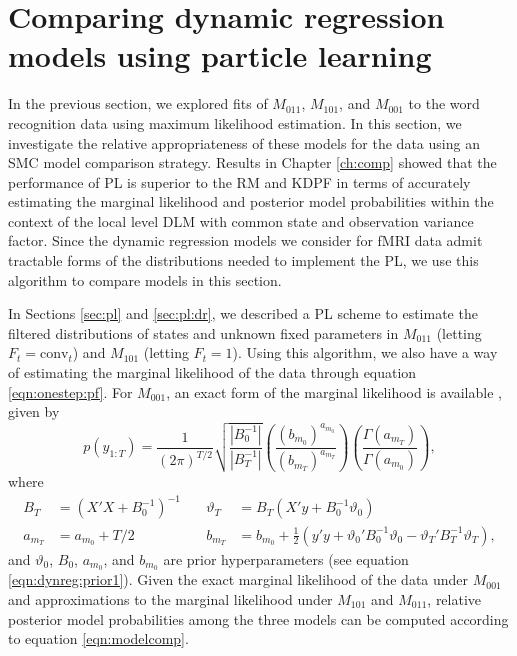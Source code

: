 \section{Comparing dynamic regression models using particle learning \label{sec:fmri:pl}}

In the previous section, we explored fits of $M_{011}$, $M_{101}$, and $M_{001}$ to the word recognition data using maximum likelihood estimation. In this section, we investigate the relative appropriateness of these models for the data using an SMC model comparison strategy. Results in Chapter \ref{ch:comp} showed that the performance of PL is superior to the RM and KDPF in terms of accurately estimating the marginal likelihood and posterior model probabilities within the context of the local level DLM with common state and observation variance factor. Since the dynamic regression models we consider for fMRI data admit tractable forms of the distributions needed to implement the PL, we use this algorithm to compare models in this section.

In Sections \ref{sec:pl} and \ref{sec:pl:dr}, we described a PL scheme to estimate the filtered distributions of states and unknown fixed parameters in $M_{011}$ (letting $F_t = \mbox{conv}_t$) and $M_{101}$ (letting $F_t = 1$). Using this algorithm, we also have a way of estimating the marginal likelihood of the data through equation \eqref{eqn:onestep:pf}. For $M_{001}$, an exact form of the marginal likelihood is available \citep{ohagan:bayes:1994}, given by
\begin{equation}
p(y_{1:T}) = \frac{1}{(2\pi)^{T/2}}\sqrt{\frac{|B_0^{-1}|}{|B_T^{-1}|}}\left(\frac{(b_{m_0})^{a_{m_0}}}{(b_{m_T})^{a_{m_T}}}\right)\left(\frac{\Gamma(a_{m_T})}{\Gamma(a_{m_0})}\right), \label{eqn:ols:marglik}
\end{equation}
where
\begin{align}
B_T &= (X'X + B_0^{-1})^{-1} &\quad \vartheta_T &= B_T(X'y + B_0^{-1}\vartheta_0) \label{eqn:bayesreg} \\
a_{m_T} &= a_{m_0} + T/2 &\quad b_{m_T} &= b_{m_0} + \frac{1}{2}(y'y + \vartheta_0'B_0^{-1}\vartheta_0 - \vartheta_T'B_T^{-1}\vartheta_T), \nonumber
\end{align}
and $\vartheta_0$, $B_0$, $a_{m_0}$, and $b_{m_0}$ are prior hyperparameters (see equation \ref{eqn:dynreg:prior1}). Given the exact marginal likelihood of the data under $M_{001}$ and approximations to the marginal likelihood under $M_{101}$ and $M_{011}$, relative posterior model probabilities among the three models can be computed according to equation \eqref{eqn:modelcomp}.

